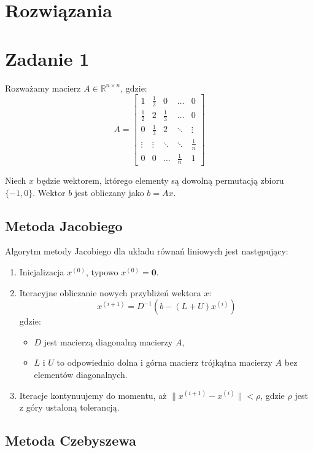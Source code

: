 \documentclass{article}
\begin{document}
\section*{Rozwiązania}

\section*{Zadanie 1}

Rozważamy macierz $A \in \mathbb{R}^{n \times n}$, gdzie:
\[
A = \begin{bmatrix}
1 & \frac{1}{2} & 0 & \dots & 0 \\
\frac{1}{2} & 2 & \frac{1}{3} & \dots & 0 \\
0 & \frac{1}{3} & 2 & \ddots & \vdots \\
\vdots & \vdots & \ddots & \ddots & \frac{1}{n} \\
0 & 0 & \dots & \frac{1}{n} & 1
\end{bmatrix}
\]

\noindent Niech $x$ będzie wektorem, którego elementy są dowolną permutacją zbioru $\{-1, 0\}$. Wektor $b$ jest obliczany jako $b = Ax$.

\subsection*{Metoda Jacobiego}

Algorytm metody Jacobiego dla układu równań liniowych jest następujący:
\begin{enumerate}
  \item Inicjalizacja $x^{(0)}$, typowo $x^{(0)} = \mathbf{0}$.
  \item Iteracyjne obliczanie nowych przybliżeń wektora $x$:
  \[
  x^{(i+1)} = D^{-1}(b - (L + U)x^{(i)})
  \]
  gdzie:
  \begin{itemize}
    \item $D$ jest macierzą diagonalną macierzy $A$,
    \item $L$ i $U$ to odpowiednio dolna i górna macierz trójkątna macierzy $A$ bez elementów diagonalnych.
  \end{itemize}
  \item Iteracje kontynuujemy do momentu, aż $\|x^{(i+1)} - x^{(i)}\| < \rho$, gdzie $\rho$ jest z góry ustaloną tolerancją.
\end{enumerate}

\subsection*{Metoda Czebyszewa}
\end{document}
